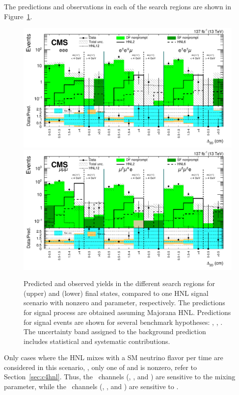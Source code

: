 The predictions and observations in each of the search regions are
shown in Figure~\ref{fig:finalyields_majorana_datacards}.

\begin{figure}[h!]
    \centering
    \includegraphics[width=.75\textwidth]{Figures/c6/results/ele_sr.pdf} \\
    \includegraphics[width=.75\textwidth]{Figures/c6/results/mu_sr.pdf}
    \caption{\label{fig:finalyields_majorana_datacards}
        Predicted and observed yields in the different search
        regions for (upper) \eex and (lower) \mmx final states,
        compared to one HNL signal scenario with nonzero \mixpare and
        \mixparm parameter, respectively. The predictions for signal
        process are obtained assuming Majorana HNL.
        Predictions for signal events are shown for several benchmark hypotheses:
        \HNLtwo, \HNLsix, \HNLtwelve.
        The uncertainty band assigned to the background prediction includes
        statistical and systematic contributions.
    }
\end{figure}

Only cases where the HNL mixes with a SM neutrino
flavor per time are considered in this scenario, \ie, only one of \mixpare and \mixparm is
nonzero, refer to Section~\ref{sec:c4hnl}.
Thus, the \eex~channels (\EEE, \EEMos, and
\EEMss) are sensitive to the \mixpare mixing
parameter, while the \mmx~channels (\MMM, \MMEos, and
\MMEss) are sensitive to \mixparm.

